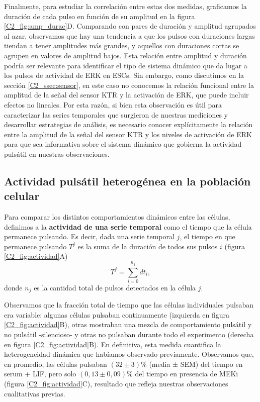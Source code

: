 \documentclass[./main.tex]{subfiles}
\begin{document}
 
Finalmente, para estudiar la correlación entre estas dos medidas, graficamos la duración de cada pulso en función de su amplitud en la figura \ref{C2_fig:amp_durac}D. Comparando con pares de duración y amplitud agrupados al azar, observamos que hay una tendencia a que los pulsos con duraciones largas tiendan a tener amplitudes más grandes, y aquellos con duraciones cortas se agrupen en valores de amplitud bajos. Esta relación entre amplitud y duración podría ser relevante para identificar el tipo de sistema dinámico que da lugar a los pulsos de actividad de ERK en ESCs. Sin embargo, como discutimos en la sección \ref{C2_ssec:sensor}, en este caso no conocemos la relación funcional entre la amplitud de la señal del sensor KTR y la activación de ERK, que puede incluir efectos no lineales. Por esta razón, si bien esta observación es útil para caracterizar las series temporales que surgieron de nuestras mediciones y desarrollar estrategias de análisis, es necesario conocer explícitamente la relación entre la amplitud de la señal del sensor KTR y los niveles de activación de ERK para que sea informativa sobre el sistema dinámico que gobierna la actividad pulsátil en nuestras observaciones. 


\subsection{Actividad pulsátil heterogénea en la población celular}

Para comparar los distintos comportamientos dinámicos entre las células, definimos a la \textbf{actividad de una serie temporal} como el tiempo que la célula permanece pulsando. Es decir, dada una serie temporal $j$, el tiempo en que permanece pulsando $T^j$ es la suma de la duración de todos sus pulsos $i$ (figura \ref{C2_fig:actividad}A) 
\begin{equation}
    T^j = \sum_{i=0}^{n_j} dt_i,
    \label{C2_eq:actividad}
\end{equation}
donde $n_j$ es la cantidad total de pulsos detectados en la célula $j$.

Observamos que la fracción total de tiempo que las células individuales pulsaban era variable: algunas células pulsaban continuamente (izquierda en figura \ref{C2_fig:actividad}B), otras mostraban una mezcla de comportamiento pulsátil y no pulsátil -silencioso- y otras no pulsaban durante todo el experimento (derecha en figura \ref{C2_fig:actividad}B). En definitiva, esta medida cuantifica la heterogeneidad dinámica que habíamos observado previamente. Observamos que, en promedio, las células pulsaban $(32 \pm 3)\%$ (media ± SEM) del tiempo en serum + LIF, pero solo $(0,13 \pm 0,09) \%$ del tiempo en presencia de MEKi (figura \ref{C2_fig:actividad}C), resultado que refleja nuestras observaciones cualitativas previas. 
\end{document}
